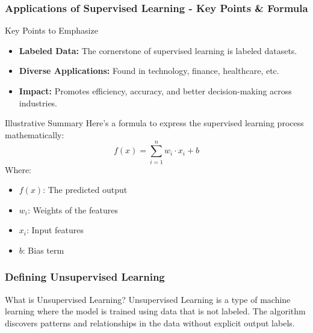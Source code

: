 \documentclass[aspectratio=169]{beamer}
\begin{document}
\begin{frame}[fragile]
    \frametitle{Applications of Supervised Learning - Key Points & Formula}
    \begin{block}{Key Points to Emphasize}
        \begin{itemize}
            \item \textbf{Labeled Data:} The cornerstone of supervised learning is labeled datasets.
            \item \textbf{Diverse Applications:} Found in technology, finance, healthcare, etc.
            \item \textbf{Impact:} Promotes efficiency, accuracy, and better decision-making across industries.
        \end{itemize}
    \end{block}

    \begin{block}{Illustrative Summary}
        Here's a formula to express the supervised learning process mathematically:
        \begin{equation}
            f(x) = \sum_{i=1}^{n} w_i \cdot x_i + b
        \end{equation}
        Where:
        \begin{itemize}
            \item \( f(x) \): The predicted output
            \item \( w_i \): Weights of the features
            \item \( x_i \): Input features
            \item \( b \): Bias term
        \end{itemize}
    \end{block}
\end{frame}

\begin{frame}[fragile]
    \frametitle{Defining Unsupervised Learning}
    
    \begin{block}{What is Unsupervised Learning?}
        Unsupervised Learning is a type of machine learning where the model is trained using data that is not labeled. 
        The algorithm discovers patterns and relationships in the data without explicit output labels.
    \end{block}
\end{frame}
\end{document}

